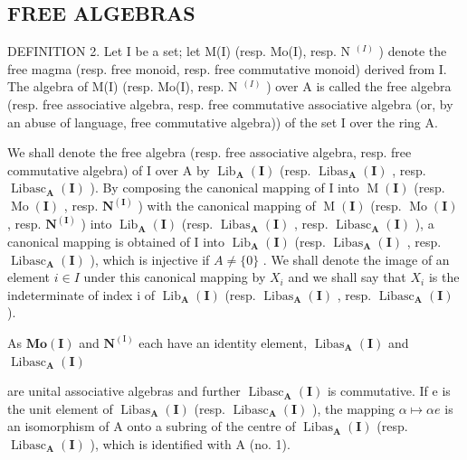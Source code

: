 \subsection{FREE ALGEBRAS}

DEFINITION 2. Let I be a set; let M(I) (resp. Mo(I), resp. N \(^{(I)}\) ) denote the free magma (resp. free monoid, resp. free commutative monoid) derived from I. The algebra of M(I) (resp. Mo(I), resp. N \(^{(I)}\) ) over A is called the free algebra (resp. free associative algebra, resp. free commutative associative algebra (or, by an abuse of language, free commutative algebra)) of the set I over the ring A.

We shall denote the free algebra (resp. free associative algebra, resp. free commutative algebra) of I over A by \(\operatorname{Lib}_{\mathbf{A}}(\mathbf{I})\) (resp. \(\operatorname{Libas}_{\mathbf{A}}(\mathbf{I})\) , resp. \(\operatorname{Libasc}_{\mathbf{A}}(\mathbf{I})\) ). By composing the canonical mapping of I into \(\operatorname{M}(\mathbf{I})\) (resp. \(\operatorname{Mo}(\mathbf{I})\) , resp. \(\mathbf{N}^{(\mathbf{I})}\) ) with the canonical mapping of \(\operatorname{M}(\mathbf{I})\) (resp. \(\operatorname{Mo}(\mathbf{I})\) , resp. \(\mathbf{N}^{(\mathbf{I})}\) ) into \(\operatorname{Lib}_{\mathbf{A}}(\mathbf{I})\) (resp. \(\operatorname{Libas}_{\mathbf{A}}(\mathbf{I})\) , resp. \(\operatorname{Libasc}_{\mathbf{A}}(\mathbf{I})\) ), a canonical mapping is obtained of I into \(\operatorname{Lib}_{\mathbf{A}}(\mathbf{I})\) (resp. \(\operatorname{Libas}_{\mathbf{A}}(\mathbf{I})\) , resp. \(\operatorname{Libasc}_{\mathbf{A}}(\mathbf{I})\) ), which is injective if \(A \neq \{0\}\) . We shall denote the image of an element \(i \in I\) under this canonical mapping by \(X_{i}\) and we shall say that \(X_{i}\) is the indeterminate of index i of \(\operatorname{Lib}_{\mathbf{A}}(\mathbf{I})\) (resp. \(\operatorname{Libas}_{\mathbf{A}}(\mathbf{I})\) , resp. \(\operatorname{Libasc}_{\mathbf{A}}(\mathbf{I})\) ).

As \(\mathbf{Mo}(\mathbf{I})\) and \(\mathbf{N}^{(\mathrm{I})}\) each have an identity element, \(\operatorname{Libas}_{\mathbf{A}}(\mathbf{I})\) and \(\operatorname{Libasc}_{\mathbf{A}}(\mathbf{I})\)

are unital associative algebras and further \(\operatorname{Libasc}_{\mathbf{A}}(\mathbf{I})\) is commutative. If e is the unit element of \(\operatorname{Libas}_{\mathbf{A}}(\mathbf{I})\) (resp. \(\operatorname{Libasc}_{\mathbf{A}}(\mathbf{I})\) ), the mapping \(\alpha \mapsto \alpha e\) is an isomorphism of A onto a subring of the centre of \(\operatorname{Libas}_{\mathbf{A}}(\mathbf{I})\) (resp. \(\operatorname{Libasc}_{\mathbf{A}}(\mathbf{I})\) ), which is identified with A (no. 1).

